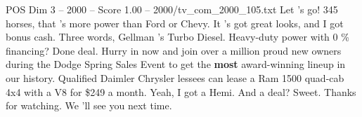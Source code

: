 \begin{textsample}{POS Dim 3 – 2000 – Score 1.00 – 2000/tv\_com\_2000\_105.txt}  \label{ex:f3_pos_087}
Let 's go! 345 horses, that 's more power than Ford or Chevy.
It 's got great looks, and I got bonus cash.
Three words, Gellman 's Turbo Diesel.
Heavy-duty power with 0 \% financing?
Done deal.
Hurry in now and join over a million proud new owners during the Dodge Spring Sales Event to get the \textbf{most} award-winning lineup in our history.
Qualified Daimler Chrysler lessees can lease a Ram 1500 quad-cab 4x4 with a V8 for \$249 a month.
Yeah, I got a Hemi.
And a deal?
Sweet.
Thanks for watching.
We 'll see you next time.

\end{textsample}
